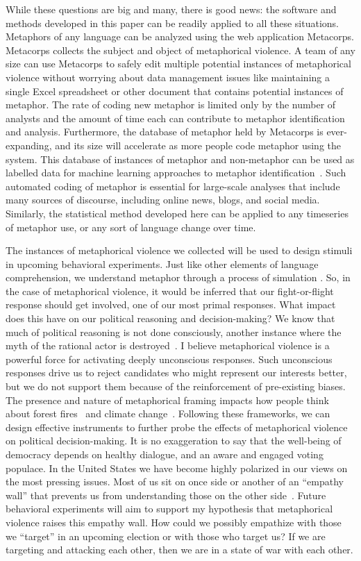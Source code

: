 While these questions are big and many, there is good news: the software and
methods developed in this paper can be readily applied to all these situations.
Metaphors of any language can be analyzed using the web application Metacorps. 
Metacorps collects the subject and object of metaphorical violence. 
A team of any size can use Metacorps to safely edit multiple potential instances 
of metaphorical violence without 
worrying about data management issues like maintaining a single Excel spreadsheet 
or other document that contains potential instances of metaphor. 
The rate of coding new metaphor is
limited only by the number of analysts and the amount of time each can 
contribute to metaphor identification and analysis. Furthermore, the database
of metaphor held by Metacorps is ever-expanding, and its size will accelerate
as more people code metaphor using the system. This database of instances of
metaphor and non-metaphor can be used as labelled data for machine learning 
approaches to metaphor identification~\cite{Shutova2015, Veale2016}. Such automated
coding of metaphor is essential for large-scale analyses that include many 
sources of discourse, including online news, blogs, and social media.
Similarly, the statistical method developed here can be applied to any 
timeseries of metaphor use, or any sort of language change over time. 

The instances of metaphorical violence we collected will be used to design 
stimuli in upcoming behavioral experiments. Just like other elements of 
language comprehension, we understand metaphor through a process of simulation
\cite{Gibbs2008}. So, in the case of metaphorical violence, it would be inferred
that our fight-or-flight response should get involved, one of our most primal responses.
What impact does this have on our political reasoning and decision-making? 
We know that much of political reasoning is not done consciously, another
instance where the myth of the rational actor is destroyed~\cite{Westen}. 
I believe metaphorical
violence is a powerful force for activating deeply unconscious responses. 
Such unconscious responses drive us to reject candidates who might represent
our interests better, but we do not support them because of the reinforcement
of pre-existing biases. The presence and nature of
metaphorical framing impacts how people think about forest fires~\cite{Matlock2015} and 
climate change~\cite{Flusberg2017, Flusberg2017a}. Following these frameworks,
we can design effective instruments to further probe the effects of metaphorical
violence on political decision-making.
It is no exaggeration to say that the well-being of democracy depends on healthy
dialogue, and an aware and engaged voting populace. In the United States we have
become highly polarized in our views on the most pressing issues. 
Most of us sit on once side or another
of an ``empathy wall'' that prevents us from understanding those on the other
side~\cite{Hochschild2016}. Future behavioral experiments will aim to support
my hypothesis that metaphorical violence raises this empathy wall. 
How could we possibly empathize with
those we ``target'' in an upcoming election or with those who target us? If 
we are targeting and attacking each other, 
then we are in a state of war with each other.

